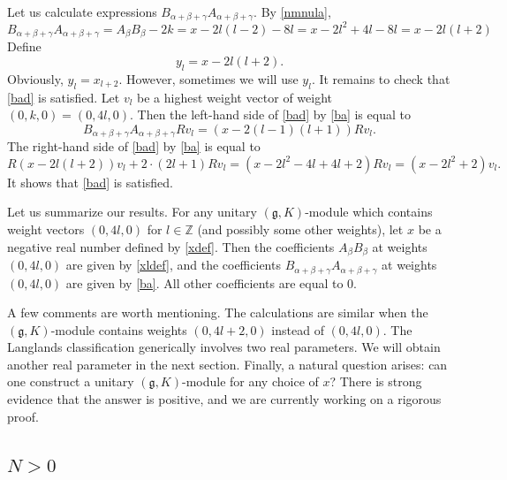 \documentclass[twoside,a4paper,12pt]{article}
\newcommand{\g}{\ensuremath{\mathfrak g}}
\theoremstyle{definition}
\begin{document}
Let us calculate expressions $B_{\alpha+\beta+\gamma}A_{\alpha+\beta+\gamma}$.
By \eqref{nmnula},
\begin{equation}\label{ba}
	B_{\alpha+\beta+\gamma}A_{\alpha+\beta+\gamma}=A_\beta B_\beta-2k=
	x-2l(l-2)-8l=x-2l^2+4l-8l=x-2l(l+2)
\end{equation}
Define
\begin{equation*}
	y_l=x-2l(l+2).
\end{equation*}
Obviously, $y_l=x_{l+2}$. However, sometimes we will use $y_l$.
It remains to check that \eqref{bad} is satisfied. Let $v_l$ be a highest
weight vector of weight $(0,k,0)=(0,4l,0)$.
Then the left-hand side of \eqref{bad} by \eqref{ba} is equal to
\begin{equation*}
	B_{\alpha+\beta+\gamma}A_{\alpha+\beta+\gamma}Rv_l=(x-2(l-1)(l+1))Rv_l.
\end{equation*}
The right-hand side of \eqref{bad} by \eqref{ba} is equal to
\begin{equation*}
	R(x-2l(l+2))v_l+2\cdot(2l+1)Rv_l=(x-2l^2-4l+4l+2)Rv_l=(x-2l^2+2)v_l.
\end{equation*}
It shows that \eqref{bad} is satisfied.

Let us summarize our results. For any unitary $(\g,K)$-module which contains
weight vectors $(0,4l,0)$ for $l\in\mathbb Z$ (and possibly some other
weights), let $x$ be a negative real number defined by \eqref{xdef}. Then the
coefficients $A_\beta B_\beta$ at weights $(0,4l,0)$ are given by
\eqref{xldef}, and the coefficients
$B_{\alpha+\beta+\gamma}A_{\alpha+\beta+\gamma}$ at weights $(0,4l,0)$ are
given by \eqref{ba}. All other coefficients are equal to $0$.

A few comments are worth mentioning. The calculations are similar when the
$(\g,K)$-module contains weights $(0,4l+2,0)$ instead of $(0,4l,0)$.
The Langlands classification generically involves two real parameters. We
will obtain another real parameter in the next section. Finally, a natural
question arises: can one construct a unitary $(\g,K)$-module for any choice
of $x$? There is strong evidence that the answer is positive, and we are
currently working on a rigorous proof.



\subsection{\texorpdfstring{$N>0$}{N greater than 0}}%
\end{document}
